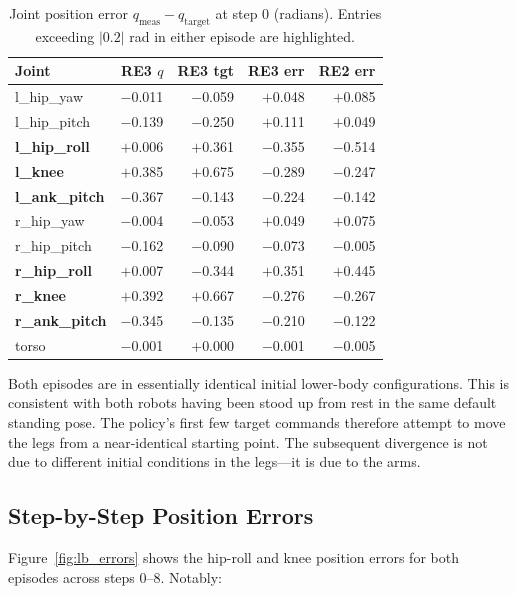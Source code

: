 \documentclass[11pt,a4paper]{article}
\newcommand{\re}[1]{\textcolor{red3}{\textbf{#1}}}
\newcommand{\good}[1]{\textcolor{blue2}{\textbf{#1}}}
\begin{document}
\begin{table}[H]
\centering
\caption{Joint position error $q_\text{meas} - q_\text{target}$ at step 0 (radians).
         Entries exceeding $|0.2|$ rad in either episode are highlighted.}
\label{tab:init_config}
\begin{tabular}{lrrrr}
\toprule
Joint & \re{RE3 $q$} & \re{RE3 tgt} & \re{RE3 err} & \good{RE2 err} \\
\midrule
l\_hip\_yaw   & $-$0.011 & $-$0.059 & $+$0.048 & $+$0.085 \\
l\_hip\_pitch & $-$0.139 & $-$0.250 & $+$0.111 & $+$0.049 \\
\textbf{l\_hip\_roll}   & $+$0.006 & $+$0.361 & $-$0.355 & $-$0.514 \\
\textbf{l\_knee}        & $+$0.385 & $+$0.675 & $-$0.289 & $-$0.247 \\
\textbf{l\_ank\_pitch}  & $-$0.367 & $-$0.143 & $-$0.224 & $-$0.142 \\
r\_hip\_yaw   & $-$0.004 & $-$0.053 & $+$0.049 & $+$0.075 \\
r\_hip\_pitch & $-$0.162 & $-$0.090 & $-$0.073 & $-$0.005 \\
\textbf{r\_hip\_roll}   & $+$0.007 & $-$0.344 & $+$0.351 & $+$0.445 \\
\textbf{r\_knee}        & $+$0.392 & $+$0.667 & $-$0.276 & $-$0.267 \\
\textbf{r\_ank\_pitch}  & $-$0.345 & $-$0.135 & $-$0.210 & $-$0.122 \\
torso         & $-$0.001 & $+$0.000 & $-$0.001 & $-$0.005 \\
\bottomrule
\end{tabular}
\end{table}

\noindent Both episodes are in essentially identical initial lower-body
configurations.  This is consistent with both robots having been stood up
from rest in the same default standing pose.  The policy's first few target
commands therefore attempt to move the legs from a near-identical starting
point.  The subsequent divergence is not due to different initial conditions
in the legs---it is due to the arms.

\subsection{Step-by-Step Position Errors}

Figure~\ref{fig:lb_errors} shows the hip-roll and knee position errors for
both episodes across steps 0--8.  Notably:
\end{document}
